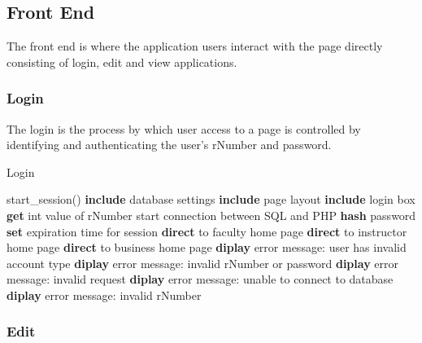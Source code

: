 \documentclass{article}
\begin{document}
	
	\subsection{Front End}
	The front end is where the application users interact with the page directly consisting of login, edit and view applications.
		
		\subsubsection{Login}
		The login is the process by which user access to a page is controlled by identifying and authenticating the user's rNumber and password. 
		
		\begin{algorithm}
			\caption{Login}
			\begin{algorithmic}[1]
			\State start\_session()
			\State \textbf{include} database settings
			\State \textbf{include} page layout
			\State \textbf{include} login box
				\State \textbf{get} int value of rNumber
				\State start connection between SQL and PHP
					\State \textbf{hash} password
					 	\State \textbf{set} expiration time for session
					 		\State \textbf{direct} to faculty home page 
					 		\State \textbf{direct} to instructor home page 
					 		\State \textbf{direct} to business home page
					 		\Else
					 		\State \textbf{diplay} error message: user has invalid account type
					 		\EndIf 	
					 	\Else
					 	\State \textbf{diplay} error message: invalid rNumber or password
					 	\EndIf 
					\Else
				 	\State \textbf{diplay} error message: invalid request
				 	\EndIf 
				\Else
			 	\State \textbf{diplay} error message: unable to connect to database	
				\EndIf
			\Else
			\State \textbf{diplay} error message: invalid rNumber	
			\EndIf			
		\end{algorithmic} 
		\end{algorithm}
		
		\subsubsection{Edit}
		
\end{document}
